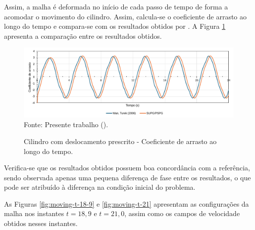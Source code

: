 Assim, a malha é deformada no início de cada passo de tempo de forma a acomodar o movimento do cilindro. Assim, calcula-se o coeficiente de arrasto ao longo do tempo e compara-se com os resultados obtidos por . A Figura \ref{fig:moving-cylinder-results} apresenta a comparação entre os resultados obtidos.

\begin{figure}[h!]
    \centering
    \caption{Cilindro com deslocamento prescrito - Coeficiente de arrasto ao longo do tempo.}
    \includegraphics[width=\linewidth]{Figuras/moving-cylinder/Cd.pdf}
    \\Fonte: Presente trabalho (\the\year).
    \label{fig:moving-cylinder-results}
\end{figure}

Verifica-se que os resultados obtidos possuem boa concordância com a referência, sendo observada apenas uma pequena diferença de fase entre os resultados, o que pode ser atribuído à diferença na condição inicial do problema.

As Figuras \ref{fig:moving-t-18-9} e \ref{fig:moving-t-21} apresentam as configurações da malha nos instantes $t=18,9$ e $t=21,0$, assim como os campos de velocidade obtidos nesses instantes.

